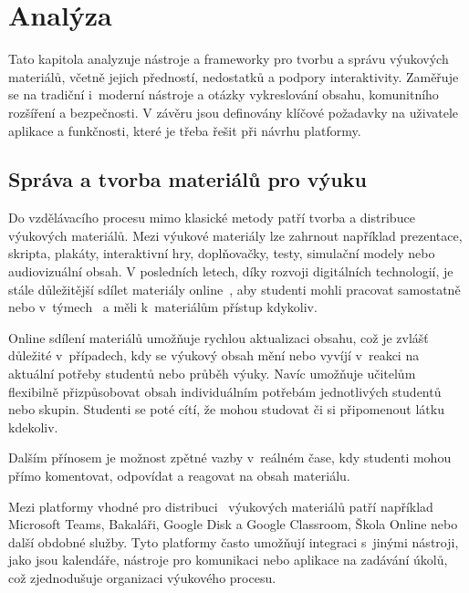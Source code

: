 \chapter{Analýza}\label{text:analyza}

\begin{chapterabstract}
Tato kapitola analyzuje nástroje a frameworky pro tvorbu a správu výukových materiálů, včetně jejich předností, nedostatků a podpory interaktivity. 
Zaměřuje se na tradiční i~moderní nástroje a otázky vykreslování obsahu, komunitního rozšíření a bezpečnosti. 
V závěru jsou definovány klíčové požadavky na uživatele aplikace a funkčnosti, které je třeba řešit při návrhu platformy.
\end{chapterabstract}


\section{Správa a tvorba materiálů pro výuku}

Do vzdělávacího procesu mimo klasické metody patří tvorba a distribuce výukových materiálů.
Mezi výukové materiály lze zahrnout například prezentace, skripta, plakáty, interaktivní hry, doplňovačky, testy, simulační modely nebo audiovizuální obsah.
V posledních letech, díky rozvoji digitálních technologií, je stále důležitější sdílet materiály online~\cite{digikompetence}, aby studenti mohli pracovat samostatně nebo v~týmech~\cite{kursch2019trendy} a měli k~materiálům přístup kdykoliv.

Online sdílení materiálů umožňuje rychlou aktualizaci obsahu, což je zvlášť důležité v~případech, kdy se výukový obsah mění nebo vyvíjí v~reakci na aktuální potřeby studentů nebo průběh výuky.
Navíc umožňuje učitelům flexibilně přizpůsobovat obsah individuálním potřebám jednotlivých studentů~\cite{kursch2019trendy} nebo skupin.
Studenti se poté cítí, že mohou studovat či si připomenout látku kdekoliv.

Dalším přínosem je možnost zpětné vazby v~reálném čase, kdy studenti mohou přímo komentovat, odpovídat a reagovat na obsah materiálu.

Mezi platformy vhodné pro distribuci~\cite{msmt_aplikace} výukových materiálů patří například Microsoft Teams, Bakaláři, Google Disk a Google Classroom, Škola Online nebo další obdobné služby.
Tyto platformy často umožňují integraci s~jinými nástroji, jako jsou kalendáře, nástroje pro komunikaci nebo aplikace na zadávání úkolů, což zjednodušuje organizaci výukového procesu.

